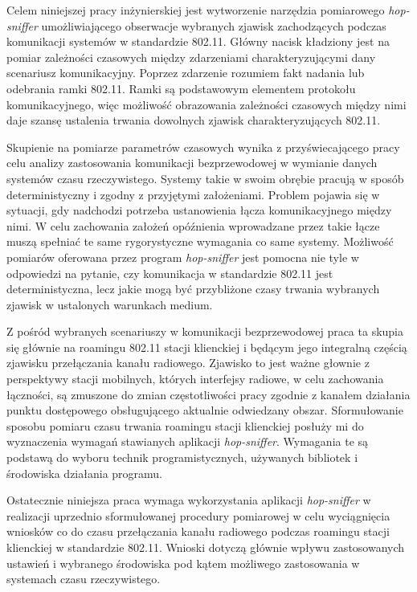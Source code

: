 
Celem niniejszej pracy inżynierskiej jest wytworzenie narzędzia pomiarowego \emph{hop-sniffer} umożliwiającego obserwacje wybranych zjawisk zachodzących podczas komunikacji systemów w standardzie 802.11. Główny nacisk kładziony jest na pomiar zależności czasowych między zdarzeniami charakteryzującymi dany scenariusz komunikacyjny. Poprzez zdarzenie rozumiem fakt nadania lub odebrania ramki 802.11. Ramki są podstawowym elementem protokołu komunikacyjnego, więc możliwość obrazowania zależności czasowych między nimi daje szansę  ustalenia trwania dowolnych zjawisk charakteryzujących 802.11.

Skupienie na pomiarze parametrów czasowych wynika z przyświecającego pracy celu analizy zastosowania komunikacji bezprzewodowej w wymianie danych systemów czasu rzeczywistego. Systemy takie w swoim obrębie pracują w sposób deterministyczny i zgodny z przyjętymi założeniami. Problem pojawia się w sytuacji, gdy nadchodzi potrzeba ustanowienia łącza komunikacyjnego między nimi. W celu zachowania założeń opóźnienia wprowadzane przez takie łącze muszą spełniać te same rygorystyczne wymagania co same systemy. Możliwość pomiarów oferowana przez program \emph{hop-sniffer} jest pomocna nie tyle w odpowiedzi na pytanie, czy komunikacja w standardzie 802.11 jest deterministyczna, lecz jakie mogą być przybliżone czasy trwania wybranych zjawisk w ustalonych warunkach medium. 

Z pośród wybranych scenariuszy w komunikacji bezprzewodowej praca ta skupia się głównie na roamingu 802.11 stacji klienckiej i będącym jego integralną częścią zjawisku przełączania kanału radiowego. Zjawisko to jest ważne głownie z perspektywy stacji mobilnych, których interfejsy radiowe, w celu zachowania łączności, są zmuszone do zmian częstotliwości pracy zgodnie z kanałem działania punktu dostępowego obsługującego aktualnie odwiedzany obszar. Sformułowanie sposobu pomiaru czasu trwania roamingu stacji klienckiej posłuży mi do wyznaczenia wymagań stawianych aplikacji \emph{hop-sniffer}. Wymagania te są podstawą do wyboru technik programistycznych, używanych bibliotek i środowiska działania programu.

Ostatecznie niniejsza praca wymaga wykorzystania aplikacji \emph{hop-sniffer} w realizacji uprzednio sformułowanej procedury pomiarowej w celu wyciągnięcia wniosków co do czasu przełączania kanału radiowego podczas roamingu stacji klienckiej w standardzie 802.11. Wnioski dotyczą głównie wpływu zastosowanych ustawień i wybranego środowiska pod kątem możliwego zastosowania w systemach czasu rzeczywistego.
